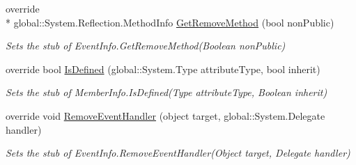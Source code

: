 \begin{DoxyCompactItemize}
override \\*
global\-::\-System.\-Reflection.\-Method\-Info \hyperlink{class_system_1_1_reflection_1_1_fakes_1_1_stub_event_info_a3a675a8507860c41a6c15f7fe99946b0}{Get\-Remove\-Method} (bool non\-Public)
\begin{DoxyCompactList}\small\item\em Sets the stub of Event\-Info.\-Get\-Remove\-Method(\-Boolean non\-Public)\end{DoxyCompactList}\item 
override bool \hyperlink{class_system_1_1_reflection_1_1_fakes_1_1_stub_event_info_a30acb57c011f47140bfa03ec7ca54e6b}{Is\-Defined} (global\-::\-System.\-Type attribute\-Type, bool inherit)
\begin{DoxyCompactList}\small\item\em Sets the stub of Member\-Info.\-Is\-Defined(\-Type attribute\-Type, Boolean inherit)\end{DoxyCompactList}\item 
override void \hyperlink{class_system_1_1_reflection_1_1_fakes_1_1_stub_event_info_a2df286e06bd7f56a1300224f91b53815}{Remove\-Event\-Handler} (object target, global\-::\-System.\-Delegate handler)
\begin{DoxyCompactList}\small\item\em Sets the stub of Event\-Info.\-Remove\-Event\-Handler(\-Object target, Delegate handler)\end{DoxyCompactList}\end{DoxyCompactItemize}
